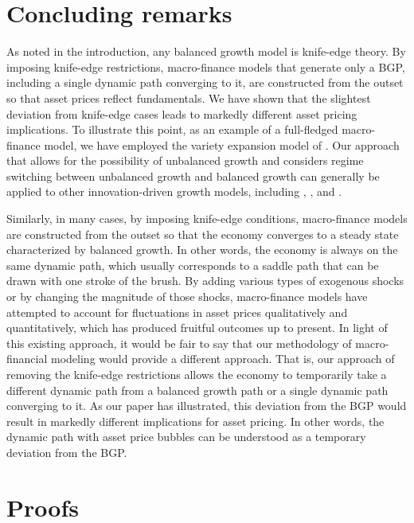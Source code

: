 \documentclass[a4paper,12pt]{article}
\numberwithin{equation}{section}
\theoremstyle{plain}
\begin{document}
\section{Concluding remarks}\label{sec:conclusion}

As noted in the introduction, any balanced growth model is knife-edge theory. By imposing knife-edge restrictions, macro-finance models that generate only a BGP, including a single dynamic path converging to it, are constructed from the outset so that asset prices reflect fundamentals. We have shown that the slightest deviation from knife-edge cases leads to markedly different asset pricing implications. To illustrate this point, as an example of a full-fledged macro-finance model, we have employed the variety expansion model of \citet[Ch.~3]{GrossmanHelpman1991book}. Our approach that allows for the possibility of unbalanced growth and considers regime switching between unbalanced growth and balanced growth can generally be applied to other innovation-driven growth models, including \citet{Romer1990}, \citet{GrossmanHelpman1991}, and \citet{AghionHowitt1992}. 

Similarly, in many cases, by imposing knife-edge conditions, macro-finance models are constructed from the outset so that the economy converges to a steady state characterized by balanced growth. In other words, the economy is always on the same dynamic path, which usually corresponds to a saddle path that can be drawn with one stroke of the brush. By adding various types of exogenous shocks or by changing the magnitude of those shocks, macro-finance models have attempted to account for fluctuations in asset prices qualitatively and quantitatively, which has produced fruitful outcomes up to present. In light of this existing approach, it would be fair to say that our methodology of macro-financial modeling would provide a different approach. That is, our approach of removing the knife-edge restrictions allows the economy to temporarily take a different dynamic path from a balanced growth path or a single dynamic path converging to it. As our paper has illustrated, this deviation from the BGP would result in markedly different implications for asset pricing. In other words, the dynamic path with asset price bubbles can be understood as a temporary deviation from the BGP.

\appendix

\section{Proofs}\label{sec:proof}
\end{document}

